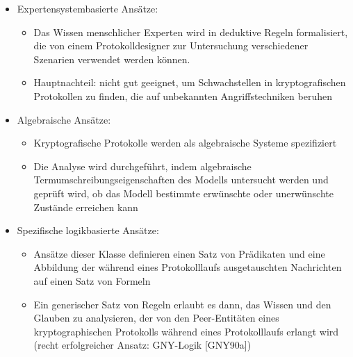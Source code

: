 \documentclass[a4paper]{article}
\begin{document}
\begin{multicols}{3}
\begin{itemize}
              \begin{itemize}
                  \item
                        Expertensystembasierte Ansätze:

                        \begin{itemize}
                            \item
                                  Das Wissen menschlicher Experten wird in deduktive Regeln
                                  formalisiert, die von einem Protokolldesigner zur Untersuchung
                                  verschiedener Szenarien verwendet werden können.
                            \item
                                  Hauptnachteil: nicht gut geeignet, um Schwachstellen in
                                  kryptografischen Protokollen zu finden, die auf unbekannten
                                  Angriffstechniken beruhen
                        \end{itemize}
                  \item
                        Algebraische Ansätze:

                        \begin{itemize}
                            \item
                                  Kryptografische Protokolle werden als algebraische Systeme
                                  spezifiziert
                            \item
                                  Die Analyse wird durchgeführt, indem algebraische
                                  Termumschreibungseigenschaften des Modells untersucht werden und
                                  geprüft wird, ob das Modell bestimmte erwünschte oder unerwünschte
                                  Zustände erreichen kann
                        \end{itemize}
                  \item
                        Spezifische logikbasierte Ansätze:

                        \begin{itemize}
                            \item
                                  Ansätze dieser Klasse definieren einen Satz von Prädikaten und
                                  eine Abbildung der während eines Protokolllaufs ausgetauschten
                                  Nachrichten auf einen Satz von Formeln
                            \item
                                  Ein generischer Satz von Regeln erlaubt es dann, das Wissen und
                                  den Glauben zu analysieren, der von den Peer-Entitäten eines
                                  kryptographischen Protokolls während eines Protokolllaufs erlangt
                                  wird (recht erfolgreicher Ansatz: GNY-Logik {[}GNY90a{]})
                        \end{itemize}
              \end{itemize}
    \end{itemize}



\end{multicols}
\end{document}
